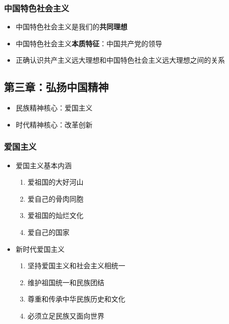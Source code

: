 \hypertarget{ux4e2dux56fdux7279ux8272ux793eux4f1aux4e3bux4e49}{%
\subsubsection{中国特色社会主义}\label{ux4e2dux56fdux7279ux8272ux793eux4f1aux4e3bux4e49}}

\begin{itemize}
\tightlist
\item
  中国特色社会主义是我们的\textbf{共同理想}
\item
  中国特色社会主义\textbf{本质特征}：中国共产党的领导
\item
  正确认识共产主义远大理想和中国特色社会主义远大理想之间的关系
\end{itemize}

\hypertarget{ux7b2cux4e09ux7ae0ux5f18ux626cux4e2dux56fdux7cbeux795e}{%
\subsection{第三章：弘扬中国精神}\label{ux7b2cux4e09ux7ae0ux5f18ux626cux4e2dux56fdux7cbeux795e}}

\begin{itemize}
\tightlist
\item
  民族精神核心：爱国主义
\item
  时代精神核心：改革创新
\end{itemize}

\hypertarget{ux7231ux56fdux4e3bux4e49}{%
\subsubsection{爱国主义}\label{ux7231ux56fdux4e3bux4e49}}

\begin{itemize}
\tightlist
\item
  爱国主义基本内涵

  \begin{enumerate}
  \def\labelenumi{\arabic{enumi}.}
  \tightlist
  \item
    爱祖国的大好河山
  \item
    爱自己的骨肉同胞
  \item
    爱祖国的灿烂文化
  \item
    爱自己的国家
  \end{enumerate}
\item
  新时代爱国主义

  \begin{enumerate}
  \def\labelenumi{\arabic{enumi}.}
  \tightlist
  \item
    坚持爱国主义和社会主义相统一
  \item
    维护祖国统一和民族团结
  \item
    尊重和传承中华民族历史和文化
  \item
    必须立足民族又面向世界
  \end{enumerate}
\end{itemize}


